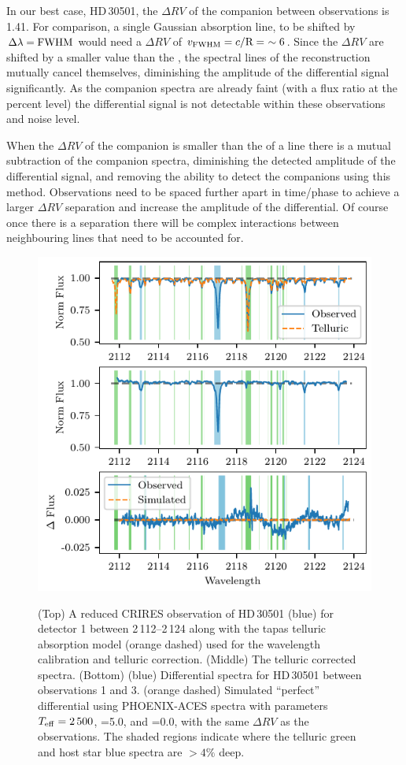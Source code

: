 In our best case, {HD\,30501}, the \(\Delta {RV}\) of the companion between observations is 1.41\kmps{}.
For comparison, a single Gaussian absorption line, to be shifted by \(\Delta\lambda = {\textrm{FWHM}}\) would need a \(\Delta {RV}\) of \(v_{\textrm{FWHM}} = c/\textrm{R} =~\sim6\)\kmps{}.
Since the \(\Delta {RV}\) are shifted by a smaller value than the {\fwhm}, the spectral lines of the reconstruction mutually cancel themselves, diminishing the amplitude of the differential signal significantly.
As the companion spectra are already faint (with a flux ratio at the percent level) the differential signal is not detectable within these observations and noise level.

When the \(\Delta {RV}\) of the companion is smaller than the {\fwhm} of a line there is a mutual subtraction of the companion spectra, diminishing the detected amplitude of the differential signal, and removing the ability to detect the companions using this method.
Observations need to be spaced further apart in time/phase to achieve a larger \(\Delta {RV}\) separation and increase the amplitude of the differential.
Of course once there is a separation there will be complex interactions between neighbouring lines that need to be accounted for.

\begin{figure}
    \centering
    \includegraphics[width=0.8\hsize]{figures/direct-recovery/differential.pdf}\\
    \caption{(Top) A reduced {CRIRES} observation of {HD\,30501} (blue) for detector 1 between 2\,112--2\,124\nm{} along with the tapas telluric absorption model ({orange} dashed) used for the wavelength calibration and telluric correction.
        (Middle) The telluric corrected spectra.
        (Bottom) ({blue}) Differential spectra for {HD\,30501} between observations 1 and 3. ({orange} dashed) Simulated ``perfect'' differential using {PHOENIX-ACES} spectra with parameters \(T_{\mathrm{eff}}{}=2\,500\)\K{}, \logg{}=5.0, and \feh{}=0.0, with the same \(\Delta {RV}\) as the observations.
        The shaded regions indicate where the telluric {green} and host star {blue} spectra are \(> 4\%\) deep.}
    \label{fig:spectral_example}
\end{figure}

